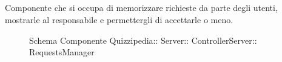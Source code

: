 \subsection{}
Componente che si occupa di memorizzare richieste da parte degli utenti, mostrarle al responsabile e permettergli di accettarle o meno.
\begin{figure}[H]
\centering
\noindent{}
\caption[Schema Componente RequestsManager]{Schema Componente Quizzipedia:: Server:: ControllerServer:: RequestsManager}
\end{figure}
